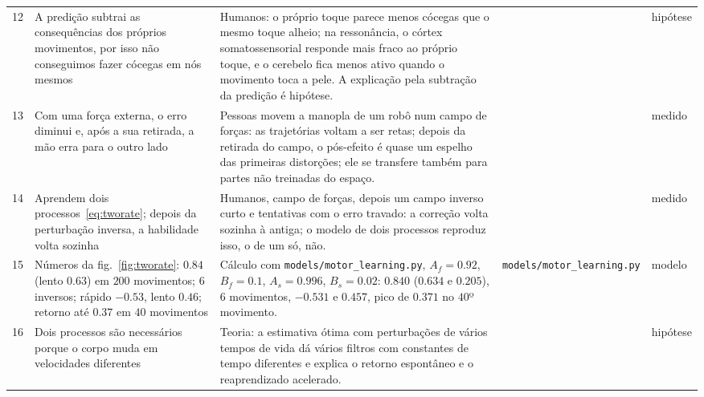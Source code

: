 {\begin{longtable}{>{\raggedright}p{0.5cm}>{\raggedright}p{4.0cm}>{\raggedright}p{5.6cm}>{\raggedright}p{2.3cm}>{\raggedright\arraybackslash}p{1.7cm}}
12 & A predição subtrai as consequências dos próprios movimentos, por isso não conseguimos fazer cócegas em nós mesmos & Humanos: o próprio toque parece menos cócegas que o mesmo toque alheio; na ressonância, o córtex somatossensorial responde mais fraco ao próprio toque, e o cerebelo fica menos ativo quando o movimento toca a pele. A explicação pela subtração da predição é hipótese. & \cite{Blakemore1998} & hipótese \\
13 & Com uma força externa, o erro diminui e, após a sua retirada, a mão erra para o outro lado & Pessoas movem a manopla de um robô num campo de forças: as trajetórias voltam a ser retas; depois da retirada do campo, o pós-efeito é quase um espelho das primeiras distorções; ele se transfere também para partes não treinadas do espaço. & \cite{ShadmehrMussaIvaldi1994} & medido \\
14 & Aprendem dois processos~\eqref{eq:tworate}; depois da perturbação inversa, a habilidade volta sozinha & Humanos, campo de forças, depois um campo inverso curto e tentativas com o erro travado: a correção volta sozinha à antiga; o modelo de dois processos reproduz isso, o de um só, não. & \cite{Smith2006} & medido \\
15 & Números da fig.~\ref{fig:tworate}: $0.84$ (lento $0.63$) em $200$ movimentos; $6$ inversos; rápido $-0.53$, lento $0.46$; retorno até $0.37$ em $40$ movimentos & Cálculo com \texttt{models/\allowbreak motor\_\allowbreak learning.py}, $A_f=0.92$, $B_f=0.1$, $A_s=0.996$, $B_s=0.02$: $0.840$ ($0.634$ e $0.205$), $6$ movimentos, $-0.531$ e $0.457$, pico de $0.371$ no $40$º movimento. & \texttt{models/\allowbreak motor\_\allowbreak learning.py} & modelo \\
16 & Dois processos são necessários porque o corpo muda em velocidades diferentes & Teoria: a estimativa ótima com perturbações de vários tempos de vida dá vários filtros com constantes de tempo diferentes e explica o retorno espontâneo e o reaprendizado acelerado. & \cite{Kording2007} & hipótese \\
\bottomrule
\end{longtable}}

